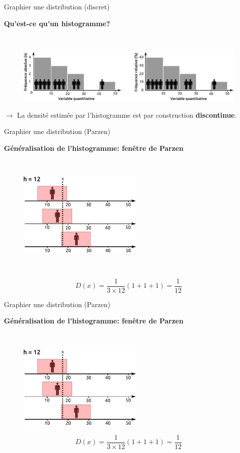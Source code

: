 \begin{frame}{Graphier une distribution (discret)}

\textbf{Qu'est-ce qu'un histogramme?}

~ 

\begin{figure}
\includegraphics[width=12cm]{Histogramme.pdf}
\end{figure}

$\rightarrow$ La densité estimée par l'histogramme est par construction \textbf{discontinue}.

\end{frame}


\begin{frame}{Graphier une distribution (Parzen)}

\textbf{Généralisation de l'histogramme: fenêtre de Parzen}

~ 

\begin{figure}
\includegraphics[width=6cm]{HistogrammeParzen.pdf}
\end{figure}

~

$$ D(x) = \frac{1}{3 \times 12} (1 + 1 + 1) = \frac{1}{12}$$

\end{frame}



\begin{frame}{Graphier une distribution (Parzen)}

\textbf{Généralisation de l'histogramme: fenêtre de Parzen}

~ 

\begin{figure}
\includegraphics[width=6cm]{HistogrammeParzen.pdf}
\end{figure}

$$ D(x) = \frac{1}{3 \times 12} (1 + 1 + 1) = \frac{1}{12}$$

\end{frame}


